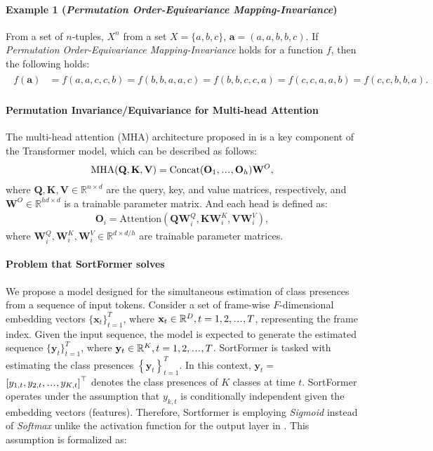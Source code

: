 \documentclass{article}
\newcommand{\poemi}{\emph{Permutation Order-Equivariance Mapping-Invariance}}
\newcommand\sdots{\makebox[1em][c]{.\hfil.\hfil.}}
\begin{document}
\paragraph{Example 1 (\poemi)}
From a set of $n$-tuples, $X^n$ from a set $X = \{a,b,c\}$, $\mathbf{a} = (a,a,b,b,c)$. If \emph{Permutation Order-Equivariance Mapping-Invariance} holds for a function $f$,
then the following holds:
\begin{align}
  \begin{split}
    f(\mathbf{a}) & = f(a,a,c,c,b) 
                    = f(b,b,a,a,c) 
                    = f(b,b,c,c,a) 
                    = f(c,c,a,a,b) 
                    = f(c,c,b,b,a).
  \end{split}
\end{align}

\paragraph{Permutation Invariance/Equivariance for Multi-head Attention}
The multi-head attention (MHA) architecture proposed in \cite{vaswani2017attention} is a key component of the Transformer model, which can be described as follows:
\begin{align}
  \text{MHA}(\mathbf{Q}, \mathbf{K}, \mathbf{V}) = \text{Concat}(\mathbf{O}_1, \sdots, \mathbf{O}_h) \mathbf{W}^O,
\end{align}
where $\mathbf{Q}, \mathbf{K}, \mathbf{V} \in \mathbb{R}^{n \times d}$ are the query, key, and value matrices, respectively,
and $\mathbf{W}^O \in \mathbb{R}^{hd \times d}$ is a trainable parameter matrix. And each head is defined as:
\begin{align}
  \mathbf{O}_i = \text{Attention}(\mathbf{Q} \mathbf{W}_i^Q, \mathbf{K} \mathbf{W}_i^K, \mathbf{V} \mathbf{W}_i^V),
\end{align}
where $\mathbf{W}_i^Q, \mathbf{W}_i^K, \mathbf{W}_i^V \in \mathbb{R}^{d \times d/h}$ are trainable parameter matrices.

\paragraph{Problem that SortFormer solves}
We propose a model designed for the simultaneous estimation of class presences from a sequence of input tokens.
Consider a set of frame-wise \( F \)-dimensional embedding vectors
$ \{ \mathbf{x}_t \}_{t=1}^T $, where $ \mathbf{x}_t \in \mathbb{R}^D, t = 1, 2, \sdots, T $, representing the frame index.
Given the input sequence, the model is expected to generate the estimated sequence $\{ \mathbf{y}_t \}_{t=1}^T$, where $ \mathbf{y}_t \in \mathbb{R}^K, t = 1, 2, \sdots, T $.
SortFormer is tasked with estimating the class presences \( \left\{\mathbf{y}_t\right\}_{t=1}^T \). In this context, $\mathbf{y}_t =$ {\small $\left[y_{1, t}, y_{2, t}, \sdots, y_{K, t}\right]^{\top}$}
denotes the class presences of \( K \) classes at time \( t \). SortFormer operates under the assumption that $ y_{k, t} $ is conditionally independent given the embedding vectors (features).
Therefore, Sortformer is employing \textit{Sigmoid} instead of \textit{Softmax} unlike the activation function for the output layer in \cite{vaswani2017attention,radford2019language}.
This assumption is formalized as:
\end{document}
